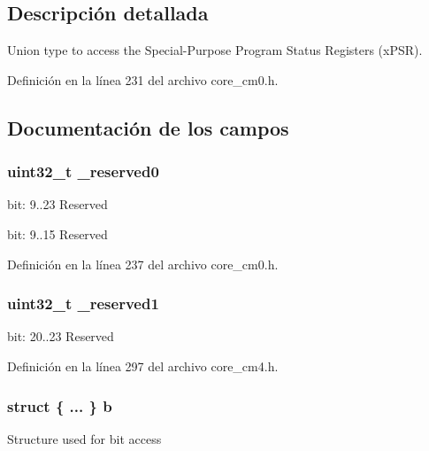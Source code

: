 \subsection{Descripción detallada}
Union type to access the Special-\/\+Purpose Program Status Registers (x\+P\+SR). 

Definición en la línea 231 del archivo core\+\_\+cm0.\+h.



\subsection{Documentación de los campos}
\subsubsection[{\texorpdfstring{\+\_\+reserved0}{_reserved0}}]{\setlength{\rightskip}{0pt plus 5cm}uint32\+\_\+t \+\_\+reserved0}\hypertarget{unionx_p_s_r___type_ac8a6a13838a897c8d0b8bc991bbaf7c1}{}\label{unionx_p_s_r___type_ac8a6a13838a897c8d0b8bc991bbaf7c1}
bit\+: 9..23 Reserved

bit\+: 9..15 Reserved 

Definición en la línea 237 del archivo core\+\_\+cm0.\+h.

\subsubsection[{\texorpdfstring{\+\_\+reserved1}{_reserved1}}]{\setlength{\rightskip}{0pt plus 5cm}uint32\+\_\+t \+\_\+reserved1}\hypertarget{unionx_p_s_r___type_a959a73d8faee56599b7e792a7c5a2d16}{}\label{unionx_p_s_r___type_a959a73d8faee56599b7e792a7c5a2d16}
bit\+: 20..23 Reserved 

Definición en la línea 297 del archivo core\+\_\+cm4.\+h.

\subsubsection[{\texorpdfstring{b}{b}}]{\setlength{\rightskip}{0pt plus 5cm}struct \{ ... \}   b}\hypertarget{unionx_p_s_r___type_a8d8c45d946ef8df11f4cac72c667e98b}{}\label{unionx_p_s_r___type_a8d8c45d946ef8df11f4cac72c667e98b}
Structure used for bit access 
